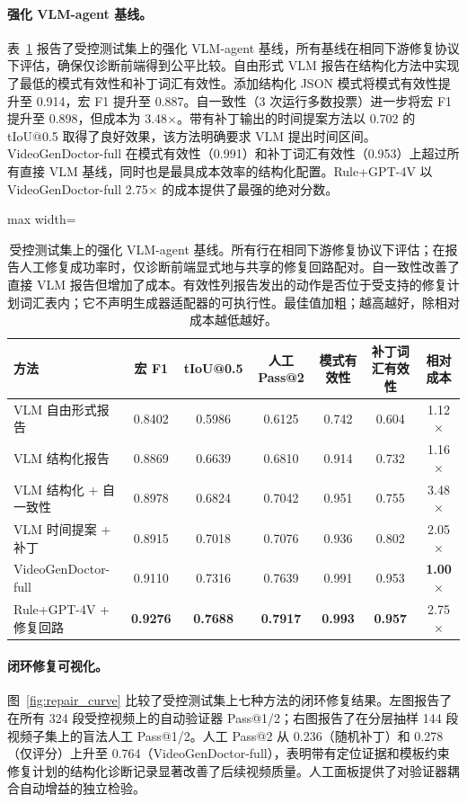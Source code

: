 \documentclass{article}
\begin{document}
\paragraph{强化 VLM-agent 基线。}
表~\ref{tab:strong_vlm_agent_baselines} 报告了受控测试集上的强化 VLM-agent 基线，所有基线在相同下游修复协议下评估，确保仅诊断前端得到公平比较。自由形式 VLM 报告在结构化方法中实现了最低的模式有效性和补丁词汇有效性。添加结构化 JSON 模式将模式有效性提升至 0.914，宏 F1 提升至 0.887。自一致性（3 次运行多数投票）进一步将宏 F1 提升至 0.898，但成本为 3.48$\times$。带有补丁输出的时间提案方法以 0.702 的 tIoU@0.5 取得了良好效果，该方法明确要求 VLM 提出时间区间。VideoGenDoctor-full 在模式有效性（0.991）和补丁词汇有效性（0.953）上超过所有直接 VLM 基线，同时也是最具成本效率的结构化配置。Rule+GPT-4V 以 VideoGenDoctor-full 2.75$\times$ 的成本提供了最强的绝对分数。

\begin{table}[t]
\centering\scriptsize
\caption{受控测试集上的强化 VLM-agent 基线。所有行在相同下游修复协议下评估；在报告人工修复成功率时，仅诊断前端显式地与共享的修复回路配对。自一致性改善了直接 VLM 报告但增加了成本。有效性列报告发出的动作是否位于受支持的修复计划词汇表内；它不声明生成器适配器的可执行性。最佳值加粗；越高越好，除相对成本越低越好。}
\label{tab:strong_vlm_agent_baselines}
\begin{adjustbox}{max width=\textwidth}
\begin{tabular}{lcccccc}
\toprule
方法 & 宏 F1 & tIoU@0.5 & 人工 Pass@2 & 模式有效性 & 补丁词汇有效性 & 相对成本 \\
\midrule
VLM 自由形式报告 & 0.8402 & 0.5986 & 0.6125 & 0.742 & 0.604 & 1.12$\times$ \\
VLM 结构化报告 & 0.8869 & 0.6639 & 0.6810 & 0.914 & 0.732 & 1.16$\times$ \\
VLM 结构化 + 自一致性 & 0.8978 & 0.6824 & 0.7042 & 0.951 & 0.755 & 3.48$\times$ \\
VLM 时间提案 + 补丁 & 0.8915 & 0.7018 & 0.7076 & 0.936 & 0.802 & 2.05$\times$ \\
VideoGenDoctor-full & 0.9110 & 0.7316 & 0.7639 & 0.991 & 0.953 & \textbf{1.00}$\times$ \\
Rule+GPT-4V + 修复回路 & \textbf{0.9276} & \textbf{0.7688} & \textbf{0.7917} & \textbf{0.993} & \textbf{0.957} & 2.75$\times$ \\
\bottomrule
\end{tabular}
\end{adjustbox}
\end{table}

\paragraph{闭环修复可视化。}
图~\ref{fig:repair_curve} 比较了受控测试集上七种方法的闭环修复结果。左图报告了在所有 324 段受控视频上的自动验证器 Pass@1/2；右图报告了在分层抽样 144 段视频子集上的盲法人工 Pass@1/2。人工 Pass@2 从 0.236（随机补丁）和 0.278（仅评分）上升至 0.764（VideoGenDoctor-full），表明带有定位证据和模板约束修复计划的结构化诊断记录显著改善了后续视频质量。人工面板提供了对验证器耦合自动增益的独立检验。
\end{document}
